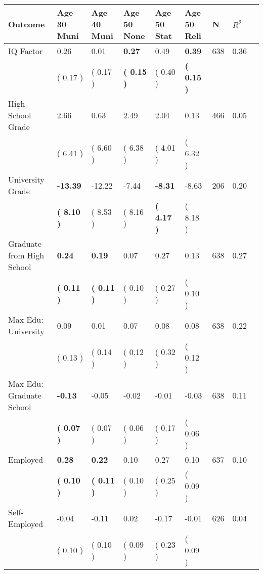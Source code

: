 \begin{tabular}{L{6.2cm} C{1.8cm} C{1.8cm} C{1.8cm} C{1.8cm} C{1.8cm} C{1.8cm} C{0.3cm} C{0.3cm}}
\toprule
 \textbf{Outcome} & \textbf{Age 30 Muni} & \textbf{Age 40 Muni} & \textbf{Age 50 None} & \textbf{Age 50 Stat} & \textbf{Age 50 Reli} & \textbf{N} & \textbf{$ R^2$} \\
\midrule
IQ Factor &      0.26 &      0.01 & \textbf{     0.27} &      0.49 & \textbf{     0.39}  & 638 &       0.36 \\ 
 & (     0.17 ) & (     0.17 ) & \textbf{(     0.15 )} & (     0.40 ) & \textbf{(     0.15 )}  & \\
High School Grade &      2.66 &      0.63 &      2.49 &      2.04 &      0.13  & 466 &       0.05 \\ 
 & (     6.41 ) & (     6.60 ) & (     6.38 ) & (     4.01 ) & (     6.32 )  & \\
University Grade & \textbf{   -13.39} &    -12.22 &     -7.44 & \textbf{    -8.31} &     -8.63  & 206 &       0.20 \\ 
 & \textbf{(     8.10 )} & (     8.53 ) & (     8.16 ) & \textbf{(     4.17 )} & (     8.18 )  & \\
Graduate from High School & \textbf{     0.24} & \textbf{     0.19} &      0.07 &      0.27 &      0.13  & 638 &       0.27 \\ 
 & \textbf{(     0.11 )} & \textbf{(     0.11 )} & (     0.10 ) & (     0.27 ) & (     0.10 )  & \\
Max Edu: University &      0.09 &      0.01 &      0.07 &      0.08 &      0.08  & 638 &       0.22 \\ 
 & (     0.13 ) & (     0.14 ) & (     0.12 ) & (     0.32 ) & (     0.12 )  & \\
Max Edu: Graduate School & \textbf{    -0.13} &     -0.05 &     -0.02 &     -0.01 &     -0.03  & 638 &       0.11 \\ 
 & \textbf{(     0.07 )} & (     0.07 ) & (     0.06 ) & (     0.17 ) & (     0.06 )  & \\
Employed & \textbf{     0.28} & \textbf{     0.22} &      0.10 &      0.27 &      0.10  & 637 &       0.10 \\ 
 & \textbf{(     0.10 )} & \textbf{(     0.11 )} & (     0.10 ) & (     0.25 ) & (     0.09 )  & \\
Self-Employed &     -0.04 &     -0.11 &      0.02 &     -0.17 &     -0.01  & 626 &       0.04 \\ 
 & (     0.10 ) & (     0.10 ) & (     0.09 ) & (     0.23 ) & (     0.09 )  & \\

\end{tabular}
